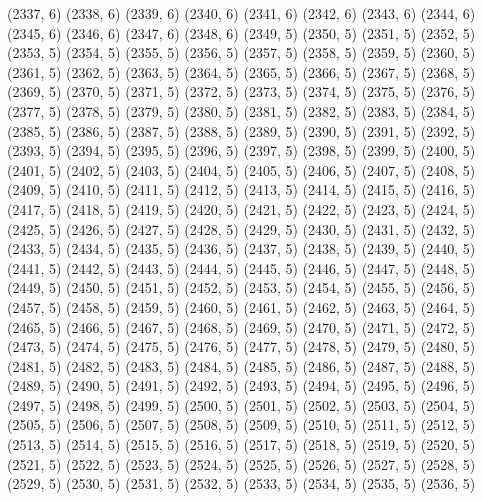 {   (2337, 6)
   (2338, 6)
   (2339, 6)
   (2340, 6)
   (2341, 6)
   (2342, 6)
   (2343, 6)
   (2344, 6)
   (2345, 6)
   (2346, 6)
   (2347, 6)
   (2348, 6)
   (2349, 5)
   (2350, 5)
   (2351, 5)
   (2352, 5)
   (2353, 5)
   (2354, 5)
   (2355, 5)
   (2356, 5)
   (2357, 5)
   (2358, 5)
   (2359, 5)
   (2360, 5)
   (2361, 5)
   (2362, 5)
   (2363, 5)
   (2364, 5)
   (2365, 5)
   (2366, 5)
   (2367, 5)
   (2368, 5)
   (2369, 5)
   (2370, 5)
   (2371, 5)
   (2372, 5)
   (2373, 5)
   (2374, 5)
   (2375, 5)
   (2376, 5)
   (2377, 5)
   (2378, 5)
   (2379, 5)
   (2380, 5)
   (2381, 5)
   (2382, 5)
   (2383, 5)
   (2384, 5)
   (2385, 5)
   (2386, 5)
   (2387, 5)
   (2388, 5)
   (2389, 5)
   (2390, 5)
   (2391, 5)
   (2392, 5)
   (2393, 5)
   (2394, 5)
   (2395, 5)
   (2396, 5)
   (2397, 5)
   (2398, 5)
   (2399, 5)
   (2400, 5)
   (2401, 5)
   (2402, 5)
   (2403, 5)
   (2404, 5)
   (2405, 5)
   (2406, 5)
   (2407, 5)
   (2408, 5)
   (2409, 5)
   (2410, 5)
   (2411, 5)
   (2412, 5)
   (2413, 5)
   (2414, 5)
   (2415, 5)
   (2416, 5)
   (2417, 5)
   (2418, 5)
   (2419, 5)
   (2420, 5)
   (2421, 5)
   (2422, 5)
   (2423, 5)
   (2424, 5)
   (2425, 5)
   (2426, 5)
   (2427, 5)
   (2428, 5)
   (2429, 5)
   (2430, 5)
   (2431, 5)
   (2432, 5)
   (2433, 5)
   (2434, 5)
   (2435, 5)
   (2436, 5)
   (2437, 5)
   (2438, 5)
   (2439, 5)
   (2440, 5)
   (2441, 5)
   (2442, 5)
   (2443, 5)
   (2444, 5)
   (2445, 5)
   (2446, 5)
   (2447, 5)
   (2448, 5)
   (2449, 5)
   (2450, 5)
   (2451, 5)
   (2452, 5)
   (2453, 5)
   (2454, 5)
   (2455, 5)
   (2456, 5)
   (2457, 5)
   (2458, 5)
   (2459, 5)
   (2460, 5)
   (2461, 5)
   (2462, 5)
   (2463, 5)
   (2464, 5)
   (2465, 5)
   (2466, 5)
   (2467, 5)
   (2468, 5)
   (2469, 5)
   (2470, 5)
   (2471, 5)
   (2472, 5)
   (2473, 5)
   (2474, 5)
   (2475, 5)
   (2476, 5)
   (2477, 5)
   (2478, 5)
   (2479, 5)
   (2480, 5)
   (2481, 5)
   (2482, 5)
   (2483, 5)
   (2484, 5)
   (2485, 5)
   (2486, 5)
   (2487, 5)
   (2488, 5)
   (2489, 5)
   (2490, 5)
   (2491, 5)
   (2492, 5)
   (2493, 5)
   (2494, 5)
   (2495, 5)
   (2496, 5)
   (2497, 5)
   (2498, 5)
   (2499, 5)
   (2500, 5)
   (2501, 5)
   (2502, 5)
   (2503, 5)
   (2504, 5)
   (2505, 5)
   (2506, 5)
   (2507, 5)
   (2508, 5)
   (2509, 5)
   (2510, 5)
   (2511, 5)
   (2512, 5)
   (2513, 5)
   (2514, 5)
   (2515, 5)
   (2516, 5)
   (2517, 5)
   (2518, 5)
   (2519, 5)
   (2520, 5)
   (2521, 5)
   (2522, 5)
   (2523, 5)
   (2524, 5)
   (2525, 5)
   (2526, 5)
   (2527, 5)
   (2528, 5)
   (2529, 5)
   (2530, 5)
   (2531, 5)
   (2532, 5)
   (2533, 5)
   (2534, 5)
   (2535, 5)
   (2536, 5)
}
